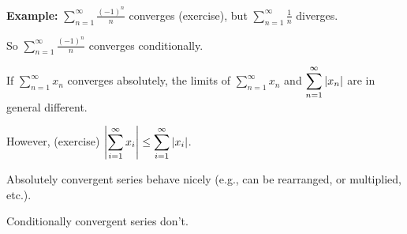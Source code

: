 \documentclass[10pt,aspectratio=169]{beamer}
\begin{document}
\begin{frame}

\textbf{Example:}
$\displaystyle
\sum_{n=1}^\infty \frac{{(-1)}^n}{n}$
\quad
converges (exercise),
\pause
but
\quad
$\displaystyle
\sum_{n=1}^\infty \frac{1}{n}$
\quad
diverges.

\pause
\medskip

So $\displaystyle\sum_{n=1}^\infty \frac{{(-1)}^n}{n}$ converges conditionally.

\pause
\medskip

If $\displaystyle\sum_{n=1}^\infty x_n$ converges absolutely, the limits of
$\displaystyle\sum_{n=1}^\infty x_n$ and
$\displaystyle\sum_{n=1}^\infty \left\lvert {x_n} \right\rvert$ are in general different.

\pause
\medskip

However, (exercise)
\quad
$\displaystyle
\left\lvert { \sum_{i=1}^\infty x_i } \right\rvert
\leq
\sum_{i=1}^\infty \left\lvert {x_i} \right\rvert$.

\pause
\medskip

Absolutely convergent series behave nicely (e.g., can be rearranged, or
multiplied, etc.). 

\pause
\medskip

Conditionally convergent series don't.
\end{frame}
\end{document}
